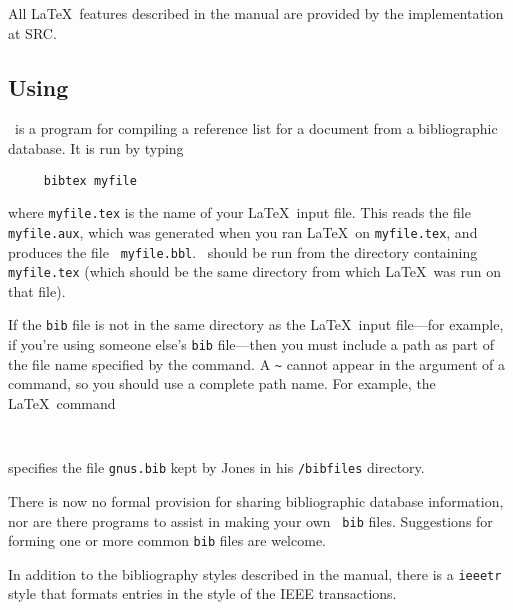 All \LaTeX\ features described in the manual are provided by 
the implementation at SRC.





\subsection{Using \BibTeX}

\BibTeX\ is a program for compiling a reference list for a document
from a bibliographic database.  It is run by typing
\begin{verbatim}
     bibtex myfile
\end{verbatim}
where \mbox{\tt myfile.tex} is the name of your \LaTeX\ input file.
This reads the file \mbox{\tt myfile.aux}, which was generated when you
ran \LaTeX\ on \mbox{\tt myfile.tex}, and produces the file \mbox{\tt
myfile.bbl}.  \BibTeX\ should be run from the directory containing
\mbox{\tt myfile.tex} (which should be the same directory from which
\LaTeX\ was run on that file).

If the {\tt bib} file is not in the same directory as the \LaTeX\ input
file---for example, if you're using someone else's {\tt bib}
file---then you must include a path as part of the file name specified
by the \hbox{\verb||} command.  A \verb|~| cannot appear
in the argument of a \hbox{\verb||} command, so you should
use a complete path name.  For example, the \LaTeX\ command
\begin{verbatim}
     
\end{verbatim}
specifies the file \mbox{\tt gnus.bib} kept by Jones in his 
\mbox{\tt /bibfiles} directory.


There is now no formal provision for sharing bibliographic database
information, nor are there programs to assist in making your own {\tt
bib} files.  Suggestions for forming one or more common {\tt bib} files
are welcome.

In addition to the bibliography styles described in the manual, there
is a {\tt ieeetr} style that formats entries in the style of the IEEE
transactions.

